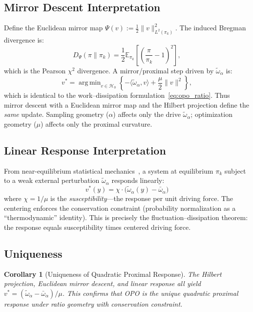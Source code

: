 \documentclass[11pt]{article}
\newtheorem{corollary}[theorem]{Corollary}
\theoremstyle{definition}
\theoremstyle{remark}
\newcommand{\E}{\mathbb{E}}
\DeclareMathOperator*{\argmin}{arg\,min}
\newcommand{\pik}{\pi_k}
\begin{document}
\subsection{Mirror Descent Interpretation}
\label{subsec:mirror}

Define the Euclidean mirror map $\Psi(v):=\frac{1}{2}\|v\|_{L^2(\pik)}^2$. The induced Bregman divergence is:
\begin{equation}
\label{eq:bregman_chi2}
D_\Psi(\pi\|\pik) = \frac{1}{2}\E_{\pik}\!\left[\left(\frac{\pi}{\pik}-1\right)^2\right],
\end{equation}
which is the Pearson $\chi^2$ divergence. A mirror/proximal step driven by $\tilde{\omega}_\alpha$ is:
\begin{equation}
v^*=\argmin_{v\in \mathcal H_0}
\left\{
-\langle \tilde{\omega}_\alpha, v\rangle + \frac{\mu}{2}\|v\|^2
\right\},
\end{equation}
which is identical to the work--dissipation formulation~\eqref{eq:opo_ratio}.
Thus mirror descent with a Euclidean mirror map and the Hilbert projection define the \emph{same} update. Sampling geometry ($\alpha$) affects only the drive $\tilde{\omega}_\alpha$; optimization geometry ($\mu$) affects only the proximal curvature.

\subsection{Linear Response Interpretation}
\label{subsec:linear_response}

From near-equilibrium statistical mechanics~\cite{Kubo1966,LandauLifshitz1980}, a system at equilibrium $\pik$ subject to a weak external perturbation $\tilde{\omega}_\alpha$ responds linearly:
\begin{equation}
v^*(y) = \chi \cdot \big(\tilde{\omega}_\alpha(y) - \bar{\omega}_\alpha\big)
\end{equation}
where $\chi = 1/\mu$ is the \emph{susceptibility}---the response per unit driving force. The centering enforces the conservation constraint (probability normalization as a ``thermodynamic'' identity). This is precisely the fluctuation--dissipation theorem: the response equals susceptibility times centered driving force.

\subsection{Uniqueness}

\begin{corollary}[Uniqueness of Quadratic Proximal Response]
The Hilbert projection, Euclidean mirror descent, and linear response all yield $v^* = (\tilde{\omega}_\alpha - \bar{\omega}_\alpha)/\mu$. This confirms that OPO is the \emph{unique} quadratic proximal response under ratio geometry with conservation constraint.
\end{corollary}
\end{document}
